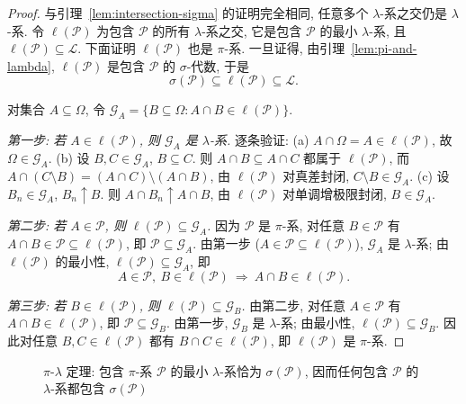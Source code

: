 \begin{proof}
与引理~\ref{lem:intersection-sigma} 的证明完全相同, 任意多个 $\lambda$-系之交仍是 $\lambda$-系. 令 $\ell(\mathcal{P})$ 为包含 $\mathcal{P}$ 的所有 $\lambda$-系之交, 它是包含 $\mathcal{P}$ 的最小 $\lambda$-系, 且 $\ell(\mathcal{P})\subseteq\mathcal{L}$. 下面证明 $\ell(\mathcal{P})$ 也是 $\pi$-系. 一旦证得, 由引理~\ref{lem:pi-and-lambda}, $\ell(\mathcal{P})$ 是包含 $\mathcal{P}$ 的 $\sigma$-代数, 于是
\[
\sigma(\mathcal{P})\subseteq\ell(\mathcal{P})\subseteq\mathcal{L}.
\]

对集合 $A\subseteq\Omega$, 令 $\mathcal{G}_A=\{B\subseteq\Omega: A\cap B\in\ell(\mathcal{P})\}$.

\emph{第一步: 若 $A\in\ell(\mathcal{P})$, 则 $\mathcal{G}_A$ 是 $\lambda$-系.} 逐条验证:
(a) $A\cap\Omega=A\in\ell(\mathcal{P})$, 故 $\Omega\in\mathcal{G}_A$.
(b) 设 $B,C\in\mathcal{G}_A$, $B\subseteq C$. 则 $A\cap B\subseteq A\cap C$ 都属于 $\ell(\mathcal{P})$, 而
$A\cap(C\setminus B)=(A\cap C)\setminus(A\cap B)$, 由 $\ell(\mathcal{P})$ 对真差封闭, $C\setminus B\in\mathcal{G}_A$.
(c) 设 $B_n\in\mathcal{G}_A$, $B_n\uparrow B$. 则 $A\cap B_n\uparrow A\cap B$, 由 $\ell(\mathcal{P})$ 对单调增极限封闭, $B\in\mathcal{G}_A$.

\emph{第二步: 若 $A\in\mathcal{P}$, 则 $\ell(\mathcal{P})\subseteq\mathcal{G}_A$.} 因为 $\mathcal{P}$ 是 $\pi$-系, 对任意 $B\in\mathcal{P}$ 有 $A\cap B\in\mathcal{P}\subseteq\ell(\mathcal{P})$, 即 $\mathcal{P}\subseteq\mathcal{G}_A$. 由第一步 ($A\in\mathcal{P}\subseteq\ell(\mathcal{P})$), $\mathcal{G}_A$ 是 $\lambda$-系; 由 $\ell(\mathcal{P})$ 的最小性, $\ell(\mathcal{P})\subseteq\mathcal{G}_A$, 即
\[
A\in\mathcal{P},\ B\in\ell(\mathcal{P})\ \Longrightarrow\ A\cap B\in\ell(\mathcal{P}).
\]

\emph{第三步: 若 $B\in\ell(\mathcal{P})$, 则 $\ell(\mathcal{P})\subseteq\mathcal{G}_B$.} 由第二步, 对任意 $A\in\mathcal{P}$ 有 $A\cap B\in\ell(\mathcal{P})$, 即 $\mathcal{P}\subseteq\mathcal{G}_B$. 由第一步, $\mathcal{G}_B$ 是 $\lambda$-系; 由最小性, $\ell(\mathcal{P})\subseteq\mathcal{G}_B$. 因此对任意 $B,C\in\ell(\mathcal{P})$ 都有 $B\cap C\in\ell(\mathcal{P})$, 即 $\ell(\mathcal{P})$ 是 $\pi$-系.
\end{proof}

\begin{figure}[htbp]
\centering
{}
\caption{$\pi$-$\lambda$ 定理: 包含 $\pi$-系 $\mathcal{P}$ 的最小 $\lambda$-系恰为 $\sigma(\mathcal{P})$, 因而任何包含 $\mathcal{P}$ 的 $\lambda$-系都包含 $\sigma(\mathcal{P})$}
\label{fig:pi-lambda}
\end{figure}

